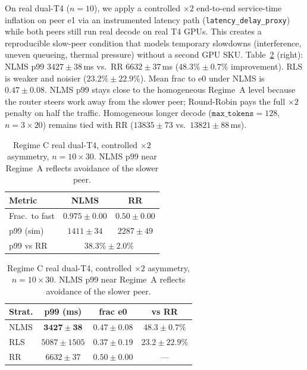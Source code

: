 \documentclass[pdflatex,sn-mathphys-num]{sn-jnl}
\begin{document}
On real dual-T4 ($n{=}10$), we apply a controlled $\times 2$ end-to-end service-time
inflation on peer e1 via an instrumented latency path
(\texttt{latency\_delay\_proxy}) while both peers still run real decode on real T4
GPUs. This creates a reproducible slow-peer condition that models temporary
slowdowns (interference, uneven queueing, thermal pressure) without a second GPU
SKU. Table~\ref{tab:realC} (right): NLMS p99 $3427\pm38$\,ms vs.\ RR $6632\pm37$\,ms
($48.3\%\pm0.7\%$ improvement). RLS is weaker and noisier ($23.2\%\pm22.9\%$). Mean
frac to e0 under NLMS is $0.47\pm0.08$. NLMS p99 stays close to the homogeneous
Regime~A level because the router steers work away from the slower peer; Round-Robin
pays the full $\times 2$ penalty on half the traffic. Homogeneous longer decode
($\texttt{max\_tokens}{=}128$, $n{=}3\times 20$) remains tied with RR
($13835\pm73$ vs.\ $13821\pm88$\,ms).

\begin{table}[ht]
\centering
\begin{minipage}[t]{0.48\textwidth}
\centering
\caption{Regime C simulation. Slope-skew dual workers, $n{=}10\times 200$.}
\label{tab:sim}
\footnotesize
\setlength{\tabcolsep}{3pt}
\begin{tabular}{@{}lcc@{}}
\toprule
Metric & NLMS & RR \\
\midrule
Frac.\ to fast & $0.975\pm0.00$ & $0.50\pm0.00$ \\
p99 (sim) & $1411\pm34$ & $2287\pm49$ \\
p99 vs RR & \multicolumn{2}{c}{$38.3\%\pm2.0\%$} \\
\bottomrule
\end{tabular}
\end{minipage}\hfill
\begin{minipage}[t]{0.50\textwidth}
\centering
\caption{Regime C real dual-T4, controlled $\times 2$ asymmetry,
$n{=}10\times 30$. NLMS p99 near Regime~A reflects avoidance of the slower peer.}
\label{tab:realC}
\footnotesize
\setlength{\tabcolsep}{2.5pt}
\begin{tabular}{@{}lccc@{}}
\toprule
Strat. & p99 (ms) & frac e0 & vs RR \\
\midrule
NLMS & $\mathbf{3427\pm38}$ & $0.47\pm0.08$ & $\mathbf{48.3\pm0.7\%}$ \\
RLS & $5087\pm1505$ & $0.37\pm0.19$ & $23.2\pm22.9\%$ \\
RR & $6632\pm37$ & $0.50\pm0.00$ & --- \\
\bottomrule
\end{tabular}
\end{minipage}
\end{table}
\end{document}
